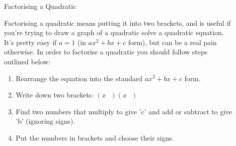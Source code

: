 \documentclass[final]{beamer}
\newlength{\sepwid}
\newlength{\onecolwid}
\newlength{\twocolwid}
\begin{document}
\begin{frame}[t]
\begin{columns}[t]
\begin{column}{\onecolwid}

\end{column} %

\begin{column}{\sepwid}\end{column} %

\begin{column}{\twocolwid} %

\begin{columns}[t,totalwidth=\twocolwid] %

\begin{column}{\onecolwid}\vspace{-.6in} %


\begin{block}{Factorising a Quadratic}

Factorising a quadratic means putting it into two brackets, and is useful if you're trying to draw a graph of a quadratic solve a quadratic equation. It's pretty easy if $a=1$ (in $ax^2+bx+c$ form), but can be a real pain otherwise.
\newline
\newline
In order to factorise a quadratic you should follow steps outlined below:

\begin{enumerate}
\item Rearrange the equation into the standard $ax^2+bx+c$ form.
\item Write down two brackets: $(x\ \ \ )(x\ \ \ )$
\item Find two numbers that multiply to give 'c' and add or subtract to give 'b' (ignoring signs).
\item Put the numbers in brackets and choose their signs.
\end{enumerate}

\end{block}


\end{column} %


\end{columns}
\end{column}
\end{columns}
\end{frame}
\end{document}
